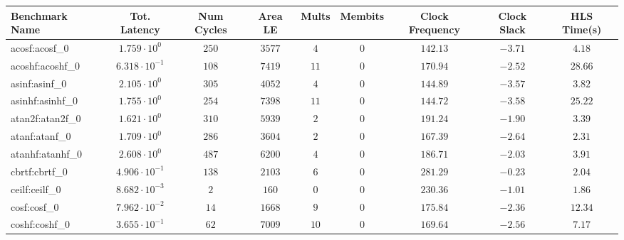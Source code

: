 \begin{tabular}{|l|c|c|c|c|c|c|c|c|}
\hline
Benchmark Name               & Tot. Latency            & Num Cycles & Area LE    & Mults   & Membits & Clock Frequency & Clock Slack & HLS Time(s) \\
\hline
acosf:acosf\_0               & $ 1.759 \cdot 10^{0}  $ & $ 250    $ & $ 3577   $ & $ 4   $ & $ 0   $ & $ 142.13      $ & $ -3.71   $ & $ 4.18    $ \\
acoshf:acoshf\_0             & $ 6.318 \cdot 10^{-1} $ & $ 108    $ & $ 7419   $ & $ 11  $ & $ 0   $ & $ 170.94      $ & $ -2.52   $ & $ 28.66   $ \\
asinf:asinf\_0               & $ 2.105 \cdot 10^{0}  $ & $ 305    $ & $ 4052   $ & $ 4   $ & $ 0   $ & $ 144.89      $ & $ -3.57   $ & $ 3.82    $ \\
asinhf:asinhf\_0             & $ 1.755 \cdot 10^{0}  $ & $ 254    $ & $ 7398   $ & $ 11  $ & $ 0   $ & $ 144.72      $ & $ -3.58   $ & $ 25.22   $ \\
atan2f:atan2f\_0             & $ 1.621 \cdot 10^{0}  $ & $ 310    $ & $ 5939   $ & $ 2   $ & $ 0   $ & $ 191.24      $ & $ -1.90   $ & $ 3.39    $ \\
atanf:atanf\_0               & $ 1.709 \cdot 10^{0}  $ & $ 286    $ & $ 3604   $ & $ 2   $ & $ 0   $ & $ 167.39      $ & $ -2.64   $ & $ 2.31    $ \\
atanhf:atanhf\_0             & $ 2.608 \cdot 10^{0}  $ & $ 487    $ & $ 6200   $ & $ 4   $ & $ 0   $ & $ 186.71      $ & $ -2.03   $ & $ 3.91    $ \\
cbrtf:cbrtf\_0               & $ 4.906 \cdot 10^{-1} $ & $ 138    $ & $ 2103   $ & $ 6   $ & $ 0   $ & $ 281.29      $ & $ -0.23   $ & $ 2.04    $ \\
ceilf:ceilf\_0               & $ 8.682 \cdot 10^{-3} $ & $ 2      $ & $ 160    $ & $ 0   $ & $ 0   $ & $ 230.36      $ & $ -1.01   $ & $ 1.86    $ \\
cosf:cosf\_0                 & $ 7.962 \cdot 10^{-2} $ & $ 14     $ & $ 1668   $ & $ 9   $ & $ 0   $ & $ 175.84      $ & $ -2.36   $ & $ 12.34   $ \\
coshf:coshf\_0               & $ 3.655 \cdot 10^{-1} $ & $ 62     $ & $ 7009   $ & $ 10  $ & $ 0   $ & $ 169.64      $ & $ -2.56   $ & $ 7.17    $ \\

\end{tabular}
